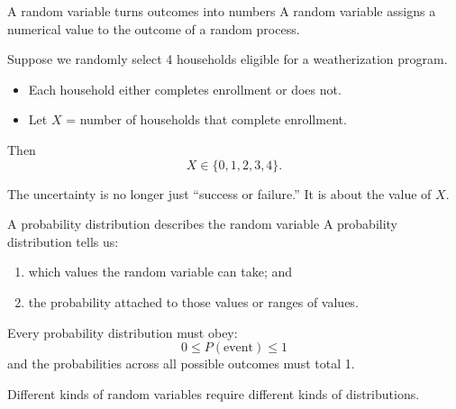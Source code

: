 \documentclass[11pt,aspectratio=169]{beamer}
\begin{document}
\begin{frame}{A random variable turns outcomes into numbers}
A \alert{random variable} assigns a numerical value to the outcome of a random process.

\vspace{0.6em}
Suppose we randomly select 4 households eligible for a weatherization program.

\begin{itemize}
  \item Each household either completes enrollment or does not.
  \item Let $X$ = number of households that complete enrollment.
\end{itemize}

Then
\[
X\in\{0,1,2,3,4\}.
\]

\vfill
The uncertainty is no longer just ``success or failure.'' It is about the \alert{value of $X$}.
\end{frame}

\begin{frame}{A probability distribution describes the random variable}
A probability distribution tells us:

\begin{enumerate}
  \item which values the random variable can take; and
  \item the probability attached to those values or ranges of values.
\end{enumerate}

\vspace{0.8em}
Every probability distribution must obey:
\[
0\leq P(\text{event})\leq 1
\]
and the probabilities across all possible outcomes must total 1.

\vfill
Different kinds of random variables require different kinds of distributions.
\end{frame}
\end{document}
